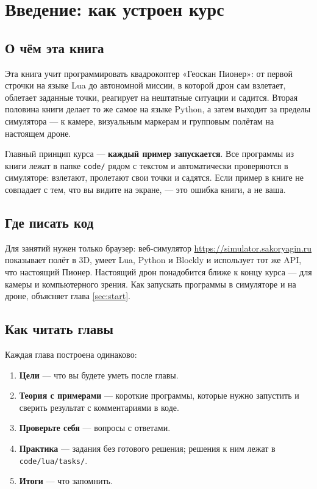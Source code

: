 \section{Введение: как устроен курс}

\subsection*{О чём эта книга}

Эта книга учит программировать квадрокоптер «Геоскан Пионер»: от первой строчки на языке Lua до автономной миссии, в которой дрон сам взлетает, облетает заданные точки, реагирует на нештатные ситуации и садится. Вторая половина книги делает то же самое на языке Python, а затем выходит за пределы симулятора --- к камере, визуальным маркерам и групповым полётам на настоящем дроне.

Главный принцип курса --- \textbf{каждый пример запускается}. Все программы из книги лежат в папке \texttt{code/} рядом с текстом и автоматически проверяются в симуляторе: взлетают, пролетают свои точки и садятся. Если пример в книге не совпадает с тем, что вы видите на экране, --- это ошибка книги, а не ваша.

\subsection*{Где писать код}

Для занятий нужен только браузер: веб-симулятор \url{https://simulator.sakoryagin.ru} показывает полёт в 3D, умеет Lua, Python и Blockly и использует тот же API, что настоящий Пионер. Настоящий дрон понадобится ближе к концу курса --- для камеры и компьютерного зрения. Как запускать программы в симуляторе и на дроне, объясняет глава \ref{sec:start}.

\subsection*{Как читать главы}

Каждая глава построена одинаково:
\begin{enumerate}
    \item \textbf{Цели} --- что вы будете уметь после главы.
    \item \textbf{Теория с примерами} --- короткие программы, которые нужно запустить и сверить результат с комментариями в коде.
    \item \textbf{Проверьте себя} --- вопросы с ответами.
    \item \textbf{Практика} --- задания без готового решения; решения к ним лежат в \texttt{code/lua/tasks/}.
    \item \textbf{Итоги} --- что запомнить.
\end{enumerate}

